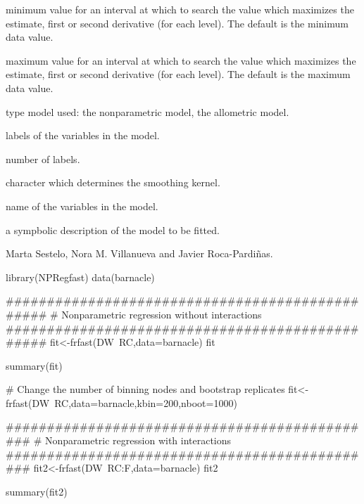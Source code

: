 \begin{Value}
\begin{ldescription}
\item[\code{ranku}] minimum value for an interval at which to search the  value which maximizes the estimate, first or second derivative  (for each level). The default is the minimum data value.

\item[\code{rankl}] maximum value for an interval at which to search the  value which maximizes the estimate, first or second derivative  (for each level). The default is the maximum data value.

\item[\code{nmodel}] type model used:  the nonparametric model,  the allometric model. 

\item[\code{label}] labels of the variables in the model.

\item[\code{numlabel}] number of labels.

\item[\code{kernel}] character which determines the smoothing kernel.

\item[\code{name}] name of the variables in the model.

\item[\code{formula}] a sympbolic description of the model to be fitted.
\end{ldescription}
\end{Value}
%
\begin{Author}\relax
Marta Sestelo, Nora M. Villanueva and Javier Roca-Pardiñas.
\end{Author}
%
\begin{Examples}
\begin{ExampleCode}
library(NPRegfast)
data(barnacle)


################################################
# Nonparametric regression without interactions
################################################
fit<-frfast(DW~RC,data=barnacle)
fit

summary(fit)

# Change the number of binning nodes and bootstrap replicates
fit<-frfast(DW~RC,data=barnacle,kbin=200,nboot=1000)

##############################################
# Nonparametric regression with interactions
##############################################
fit2<-frfast(DW~RC:F,data=barnacle)
fit2

summary(fit2)
\end{ExampleCode}
\end{Examples}




